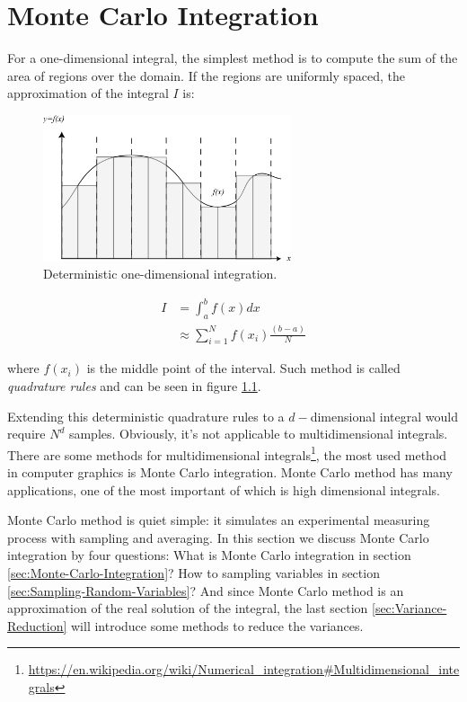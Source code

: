 \chapter{Monte Carlo Integration}\label{ch:monte-carlo}
For a one-dimensional integral, the simplest method is to compute the sum of the area of regions over the domain. If the regions are uniformly spaced, the approximation of the integral $I$ is:

\begin{figure}
\sidecaption
	\includegraphics[width=0.65\textwidth]{graphics/gi/mc-1}
	\caption{Deterministic one-dimensional integration.}
	\label{f:quadrature-rules}
\end{figure} 

\begin{equation}
	\begin{aligned}
		I&=\int_{a}^{b}f(x)dx \\
		&\approx \sum_{i=1}^{N}f(x_i)\frac{(b-a)}{N}
	\end{aligned}
\end{equation}

where $f(x_i)$ is the middle point of the interval. Such method is called \textit{quadrature rules} and can be seen in figure \ref{f:quadrature-rules}.

Extending this deterministic quadrature rules to a $d-$dimensional integral would require $N^d$ samples. Obviously, it's not applicable to multidimensional integrals. There are some methods for multidimensional integrals\footnote{\url{https://en.wikipedia.org/wiki/Numerical_integration\#Multidimensional\_integrals}}, the most used method in computer graphics is Monte Carlo integration. Monte Carlo method has many applications, one of the most important of which is high dimensional integrals.

Monte Carlo method is quiet simple: it simulates an experimental measuring process with sampling and averaging. In this section we discuss Monte Carlo integration by four questions: What is Monte Carlo integration in section \ref{sec:Monte-Carlo-Integration}? How to sampling variables in section \ref{sec:Sampling-Random-Variables}? And since Monte Carlo method is an approximation of the real solution of the integral, the last section \ref{sec:Variance-Reduction} will introduce some methods to reduce the variances.

